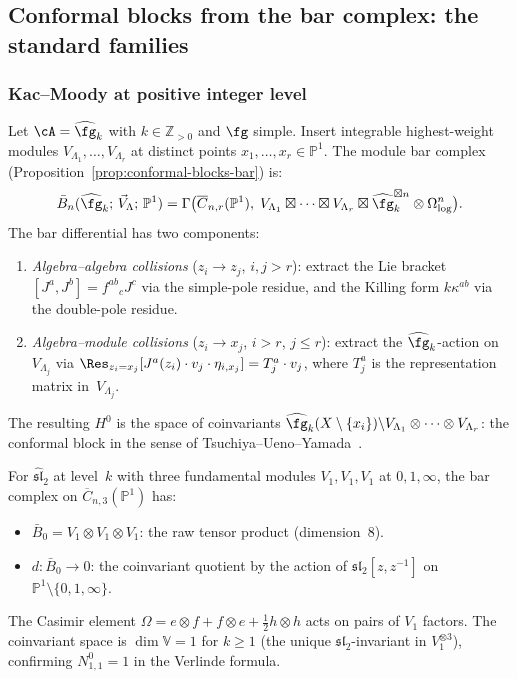 \subsection{Conformal blocks from the bar complex: the standard families}
\label{sec:conformal-blocks-families}

\subsubsection{Kac--Moody at positive integer level}

Let $\cA = \widehat{\fg}_k$ with $k \in \mathbb{Z}_{>0}$ and
$\fg$ simple.  Insert integrable highest-weight modules
$V_{\Lambda_1}, \ldots, V_{\Lambda_r}$ at distinct points
$x_1, \ldots, x_r \in \mathbb{P}^1$.  The module bar complex
(Proposition~\ref{prop:conformal-blocks-bar}) is:
\[
\bar{B}_n(\widehat{\fg}_k;\, \vec{V}_\Lambda;\, \mathbb{P}^1)
= \Gamma\bigl(\overline{C}_{n,r}(\mathbb{P}^1),\;
V_{\Lambda_1} \boxtimes \cdots \boxtimes V_{\Lambda_r}
\boxtimes \widehat{\fg}_k^{\boxtimes n}
\otimes \Omega^n_{\log}\bigr).
\]
The bar differential has two components:
\begin{enumerate}
\item \emph{Algebra--algebra collisions} ($z_i \to z_j$,
  $i,j > r$): extract the Lie bracket $[J^a, J^b] = f^{ab}{}_c J^c$
  via the simple-pole residue, and the Killing form
  $k\kappa^{ab}$ via the double-pole residue.
\item \emph{Algebra--module collisions} ($z_i \to x_j$,
  $i > r$, $j \le r$): extract the $\widehat{\fg}_k$-action
  on~$V_{\Lambda_j}$ via $\Res_{z_i = x_j}[J^a(z_i) \cdot
  v_j \cdot \eta_{i,x_j}] = T^a_j \cdot v_j$, where
  $T^a_j$ is the representation matrix in~$V_{\Lambda_j}$.
\end{enumerate}
The resulting $H^0$ is the space of coinvariants
$\widehat{\fg}_k(X \setminus \{x_i\}) \backslash
V_{\Lambda_1} \otimes \cdots \otimes V_{\Lambda_r}$: the conformal
block in the sense of Tsuchiya--Ueno--Yamada~\cite{TUY89}.

\begin{example}
\label{ex:three-point-bar}
For $\widehat{\mathfrak{sl}}_2$ at level~$k$ with three
fundamental modules $V_1, V_1, V_1$ at $0, 1, \infty$, the
bar complex on $\overline{C}_{n,3}(\mathbb{P}^1)$ has:
\begin{itemize}
\item $\bar{B}_0 = V_1 \otimes V_1 \otimes V_1$: the raw tensor
  product (dimension~$8$).
\item $d\colon \bar{B}_0 \to 0$: the coinvariant quotient by the
  action of $\mathfrak{sl}_2[z, z^{-1}]$ on
  $\mathbb{P}^1 \setminus \{0,1,\infty\}$.
\end{itemize}
The Casimir element
$\Omega = e \otimes f + f \otimes e + \tfrac{1}{2}h \otimes h$
acts on pairs of $V_1$ factors.  The coinvariant space is
$\dim \mathbb{V} = 1$ for $k \ge 1$ (the unique
$\mathfrak{sl}_2$-invariant in $V_1^{\otimes 3}$), confirming
$N_{1,1}^0 = 1$ in the Verlinde formula.
\end{example}

